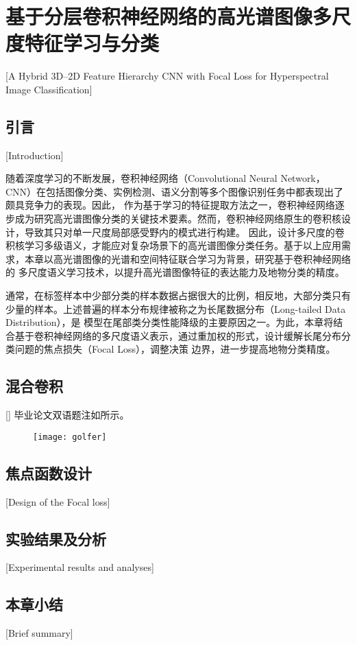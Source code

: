 
\chapter{基于分层卷积神经网络的高光谱图像多尺度特征学习与分类}[A Hybrid 3D–2D Feature Hierarchy CNN with Focal Loss for
Hyperspectral Image Classification]

\section{引言}[Introduction]

随着深度学习的不断发展，卷积神经网络（Convolutional Neural Network， CNN）在包括图像分类、实例检测、语义分割等多个图像识别任务中都表现出了颇具竞争力的表现。因此，
作为基于学习的特征提取方法之一，卷积神经网络逐步成为研究高光谱图像分类的关键技术要素。然而，卷积神经网络原生的卷积核设计，导致其只对单一尺度局部感受野内的模式进行构建。
因此，设计多尺度的卷积核学习多级语义，才能应对复杂场景下的高光谱图像分类任务。基于以上应用需求，本章以高光谱图像的光谱和空间特征联合学习为背景，研究基于卷积神经网络的
多尺度语义学习技术，以提升高光谱图像特征的表达能力及地物分类的精度。\par
通常，在标签样本中少部分类的样本数据占据很大的比例，相反地，大部分类只有少量的样本。上述普遍的样本分布规律被称之为长尾数据分布（Long-tailed Data Distribution），是
模型在尾部类分类性能降级的主要原因之一。为此，本章将结合基于卷积神经网络的多尺度语义表示，通过重加权的形式，设计缓解长尾分布分类问题的焦点损失（Focal Loss），调整决策
边界，进一步提高地物分类精度。

\section{混合卷积}[]
毕业论文双语题注如所示。
\lipsum[1]

\begin{figure}[!h]
	\centering
	\texttt{[image: golfer]}
\end{figure}


\section{焦点函数设计}[Design of the Focal loss]
\lipsum[1]


\section{实验结果及分析}[Experimental results and analyses]
\lipsum[1]


\section{本章小结}[Brief summary]
\lipsum[1]
